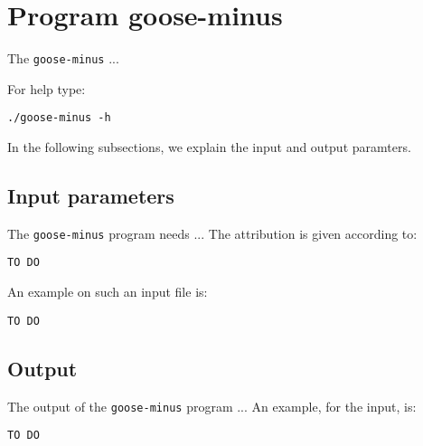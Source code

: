 \section{Program goose-minus}
The \texttt{goose-minus} ...

For help type:
\begin{lstlisting}
./goose-minus -h
\end{lstlisting}
In the following subsections, we explain the input and output paramters.

\subsection*{Input parameters}

The \texttt{goose-minus} program needs ...
The attribution is given according to:
\begin{lstlisting}
TO DO
\end{lstlisting}

An example on such an input file is:
\begin{lstlisting}
TO DO
\end{lstlisting}

\subsection*{Output}
The output of the \texttt{goose-minus} program ...
An example, for the input, is:
\begin{lstlisting}
TO DO
\end{lstlisting}